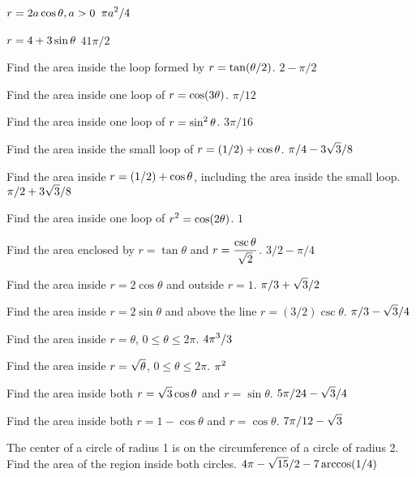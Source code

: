 \exercise $\displaystyle r=2a\cos\theta, a>0$
\answer $\displaystyle \pi a^2/4$
\endanswer
\endexercise

\exercise $\displaystyle r=4+3\sin\theta$
\answer $41\pi/2$
\endanswer

\endtwocol
\endexercise

\exercise Find the area inside the loop formed by
$\displaystyle r=\tan(\theta/2)$.
\answer $2-\pi/2$
\endanswer
\endexercise

\exercise Find the area inside one loop of $\displaystyle r=\cos(3\theta)$.
\answer $\pi/12$
\endanswer
\endexercise

\exercise Find the area inside one loop of $\displaystyle r=\sin^2\theta$.
\answer $3\pi/16$
\endanswer
\endexercise

\exercise Find the area inside the small loop of $\displaystyle r=(1/2)+\cos\theta$.
\answer $\displaystyle \pi/4-3\sqrt3/8$
\endanswer
\endexercise

\exercise Find the area inside $\displaystyle r=(1/2)+\cos\theta$, including the
area inside the small loop.
\answer $\displaystyle \pi/2+3\sqrt3/8$
\endanswer
\endexercise

\exercise Find the area inside one loop of $\displaystyle r^2=\cos(2\theta)$.
\answer $1$
\endanswer
\endexercise

\exercise Find the area enclosed by $r=\tan\theta$ and 
$\displaystyle r={\csc\theta\over\sqrt2}$.
\answer $3/2-\pi/4$
\endanswer
\endexercise

\exercise Find the area inside $r=2\cos\theta$ and outside
$r=1$.
\answer $\displaystyle \pi/3+\sqrt3/2$
\endanswer
\endexercise

\exercise Find the area inside $r=2\sin\theta$ and above
the line $r=(3/2)\csc\theta$.
\answer $\displaystyle \pi/3-\sqrt3/4$
\endanswer
\endexercise

\exercise Find the area inside $r=\theta$, $0\le\theta\le2\pi$.
\answer $\displaystyle 4\pi^3/3$
\endanswer
\endexercise

\exercise Find the area inside $\displaystyle r=\sqrt{\theta}$, $0\le\theta\le2\pi$.
\answer $\displaystyle \pi^2$
\endanswer
\endexercise

\exercise Find the area inside both $\displaystyle r=\sqrt3\cos\theta$ and
$r=\sin\theta$.
\answer $\displaystyle 5\pi/24-\sqrt3/4$
\endanswer
\endexercise

\exercise Find the area inside both $r=1-\cos\theta$
and $r=\cos\theta$.
\answer $\displaystyle 7\pi/12-\sqrt3$
\endanswer
\endexercise

\exercise The center of a circle of radius 1 is on the 
circumference of a circle of radius 2. Find the area 
of the region inside both circles.
\answer $\displaystyle 4\pi-\sqrt{15}/2-7\arccos(1/4)$
\endanswer
\endexercise

